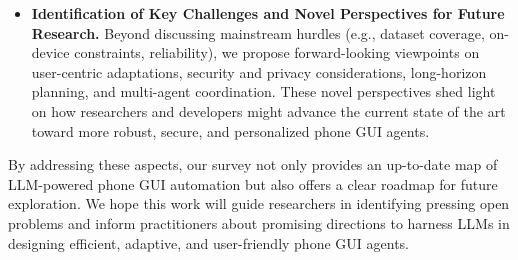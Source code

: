 \begin{itemize}
    \item \textbf{Identification of Key Challenges and Novel Perspectives for Future Research.} 
    Beyond discussing mainstream hurdles (e.g., dataset coverage, on-device constraints, reliability), we propose forward-looking viewpoints on user-centric adaptations, security and privacy considerations, long-horizon planning, and multi-agent coordination. These novel perspectives shed light on how researchers and developers might advance the current state of the art toward more robust, secure, and personalized phone GUI agents.
\end{itemize}

By addressing these aspects, our survey not only provides an up-to-date map of LLM-powered phone GUI automation but also offers a clear roadmap for future exploration. We hope this work will guide researchers in identifying pressing open problems and inform practitioners about promising directions to harness LLMs in designing efficient, adaptive, and user-friendly phone GUI agents.
